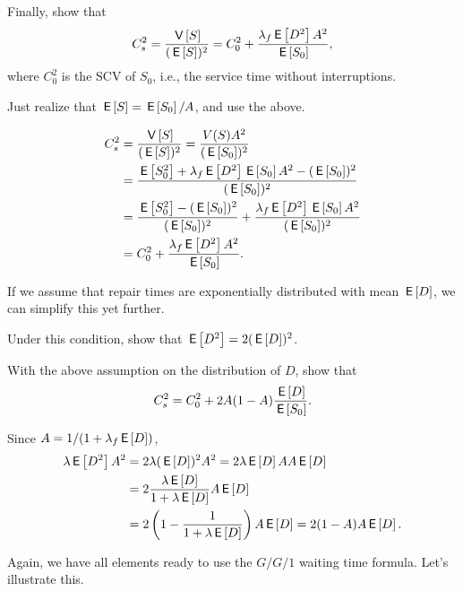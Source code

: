 \begin{exercise}
  Finally, show that
  \begin{equation*}
    C_s^2 = \frac{\V{S}}{(\E S)^2} = C_0^2 + \frac{\lambda_f \E{D^2} A^2}{\E{S_0}},
  \end{equation*}
where $C_0^2$ is the SCV of $S_0$, i.e., the service time without interruptions. 
\begin{hint} Just realize that $\E{S} = \E{S_0}/A$, and use the above.
\end{hint}
\begin{solution}
  \begin{align*}
C_s^2 &= \frac{\V{S}}{(\E S)^2} =\frac{V(S) A^2}{(\E{S_0})^2} \\
&=\frac{\E{S_0^2} + \lambda_f \E{D^2} \E{S_0}A^2 -(\E{S_0})^2}{(\E{S_0})^2} \\
&=\frac{\E{S_0^2} -(\E{S_0})^2}{(\E{S_0})^2} + \frac{\lambda_f \E{D^2} \E{S_0}A^2}{(\E{S_0})^2} \\
&=C_0^2 + \frac{\lambda_f \E{D^2}A^2}{\E{S_0}}.
  \end{align*}
\end{solution}
\end{exercise}

If we assume that repair times are exponentially distributed with mean $\E{D}$, we can simplify this yet further.
\begin{exercise}
  Under this condition, show that $\E{D^2}=2(\E D)^2$. 
\end{exercise}
\begin{exercise}
With the above assumption on the distribution of $D$, show that
  \begin{equation*}
    C_s^2 = C_0^2 + 2 A(1-A) \frac{\E{D}}{\E{S_0}}.
  \end{equation*}
\begin{solution} 
Since $A=1/(1+\lambda_f \E D)$, 
  \begin{equation*}
    \begin{split}
    \lambda \E{D^2} A^2 
&= 2\lambda (\E D)^2 A^2 = 2 \lambda \E D A A \E D \\
&= 2 \frac{\lambda \E D }{1+\lambda \E D} A \E D \\
&= 2 \left(1-\frac{1}{1+\lambda \E D}\right) A \E D  = 2(1-A)A \E D.
    \end{split}
  \end{equation*}
\end{solution}
\end{exercise}

Again, we have all elements ready to use the $G/G/1$ waiting time formula. Let's illustrate this. 

